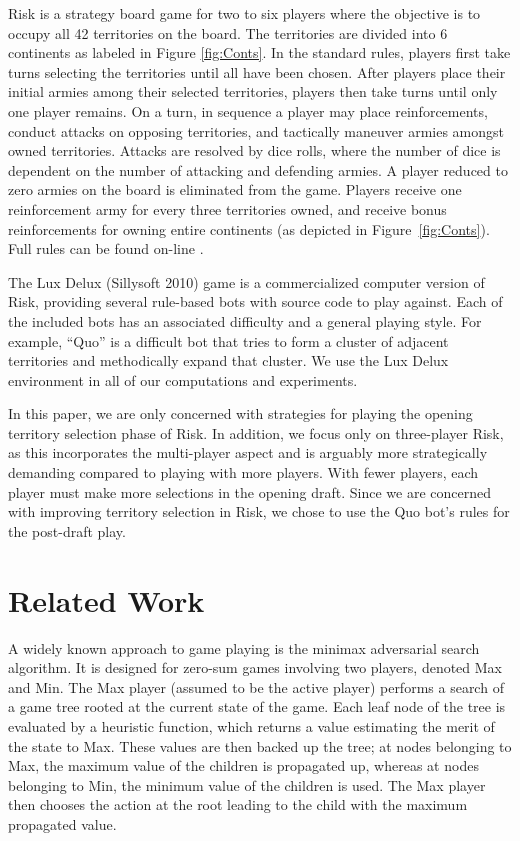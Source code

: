 \documentclass[letterpaper]{article}
\numberwithin{equation}{section}
\numberwithin{theorem}{section}
\numberwithin{lemma}{section}
\numberwithin{df}{section}
\begin{document}
Risk is a strategy board game for two to six players where the objective is to occupy all 42 territories on the board.  The territories are divided into 6 continents as labeled in Figure \ref{fig:Conts}.  In the standard rules, players first take turns selecting the territories until all have been chosen.  After players place their initial armies among their selected territories, players then take turns until only one player remains.  On a turn, in sequence a player may place reinforcements, conduct attacks on opposing territories, and tactically maneuver armies amongst owned territories.  Attacks are resolved by dice rolls, where the number of dice is dependent on the number of attacking and defending armies.  A player reduced to zero armies on the board is eliminated from the game.  Players receive one reinforcement army for every three territories owned, and receive bonus reinforcements for owning entire continents (as depicted in Figure~\ref{fig:Conts}). %
Full rules can be found on-line \cite{Risk}.

The Lux Delux (Sillysoft 2010) \nocite{Lux} %
game is a commercialized computer version of Risk, providing several rule-based bots with source code to play against.  Each of the included bots has an associated difficulty and a general playing style.  For example, ``Quo'' is a difficult bot that tries to form a cluster of adjacent territories and methodically expand that cluster.  We use the Lux Delux environment in all of our computations and experiments.  

In this paper, we are only concerned with strategies for playing the opening territory selection phase of Risk.  In addition, we focus only on three-player Risk, as this incorporates the multi-player aspect and is arguably more strategically demanding compared to playing with more players.  With fewer players, each player must make more selections in the opening draft.  Since we are concerned with improving territory selection in Risk, we chose to use the Quo bot's rules for the post-draft play. 

\section{Related Work}

A widely known approach to game playing is the minimax adversarial search algorithm.  It is designed for zero-sum games involving two players, denoted Max and Min.  The Max player (assumed to be the active player) performs a search of a game tree rooted at the current state of the game.  Each leaf node of the tree is evaluated by a heuristic function, which returns a value estimating the merit of the state to Max.  These values are then backed up the tree; at nodes belonging to Max, the maximum value of the children is propagated up, whereas at nodes belonging to Min, the minimum value of the children is used.  The Max player then chooses the action at the root leading to the child with the maximum propagated value.
\end{document}
